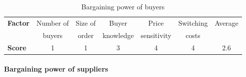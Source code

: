 \begin{table}[H]
\centering
\caption{Bargaining power of buyers}
\label{tab:substitute-products}
\begin{tabular}{lcccccc}
\toprule
\multirow{2}{*}{\textbf{Factor}} & Number of    & Size of   & Buyer          & Price          & Switching & Average  \\
                                 & buyers       & order     & knowledge      & sensitivity    & costs     &          \\\midrule
\textbf{Score}                   & 1            & 1         & 3              & 4              & 4         & 2.6       \\\bottomrule
\end{tabular}%
\end{table}

\paragraph{Bargaining power of suppliers}
